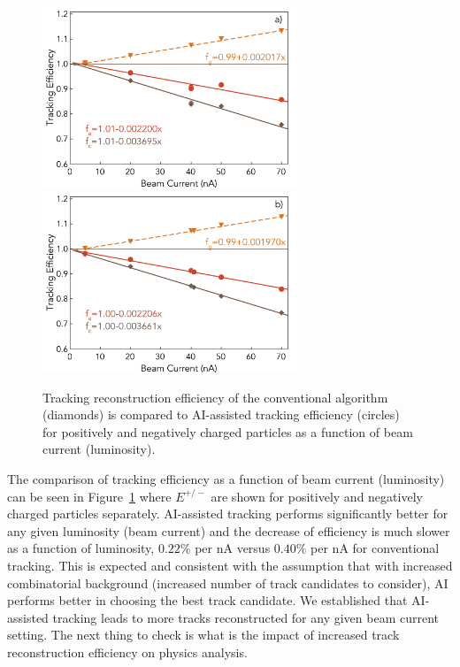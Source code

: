  \begin{figure}[!ht]
\begin{center}
 \includegraphics[width=3.0in]{images/figure_lscan_pos.pdf}
 \includegraphics[width=3.0in]{images/figure_lscan_neg.pdf}
\caption {Tracking reconstruction efficiency of the conventional algorithm (diamonds)
is compared to AI-assisted tracking efficiency (circles) for positively and negatively 
charged particles as a function of beam current (luminosity).   }
 \label{lumi:scan}
 \end{center}
\end{figure}

The comparison of tracking efficiency as a function of beam current (luminosity) can be 
seen in Figure~\ref{lumi:scan} where $E^{+/-}$ are shown for positively and negatively charged 
particles separately. AI-assisted tracking performs significantly better for any given luminosity 
(beam current) and the decrease of efficiency is much slower as a function of luminosity, $0.22\%$ 
per nA versus $0.40\%$ per nA for conventional tracking. This is expected and consistent with the 
assumption that with increased combinatorial background (increased number of track candidates 
to consider), AI performs better in choosing the best track candidate. We established that AI-assisted
tracking leads to more tracks reconstructed for any given beam current setting. The next thing to 
check is what is the impact of increased track reconstruction efficiency on physics analysis.

